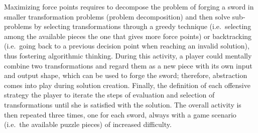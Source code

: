 Maximizing force points requires to decompose the problem of forging a sword in smaller transformation problems (problem decomposition) and then solve sub-problems by selecting transformations through a greedy technique (i.e.\ selecting among the available pieces the one that gives more force points) or backtracking (i.e.\ going back to a previous decision point when reaching an invalid solution), thus fostering algorithmic thinking. During this activity, a player could mentally combine two transformations and regard them as a new piece with its own input and output shape, which can be used to forge the sword; therefore, abstraction comes into play during solution creation. Finally, the definition of each offensive strategy  the player to iterate the steps of evaluation and selection of transformations until she is satisfied with the solution. The overall activity is then repeated three times, one for each sword, always with a game scenario (i.e.\ the available puzzle pieces) of increased difficulty.

